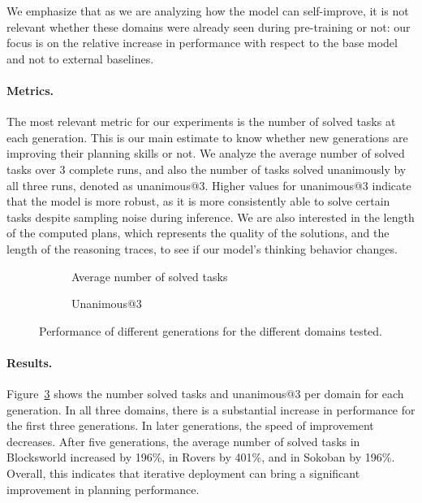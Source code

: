 We emphasize that as we are analyzing how the model can self-improve, it is not
relevant whether these domains were already seen during pre-training or not: our
focus is on the relative increase in performance with respect to the base model and not
to external baselines.

\paragraph{Metrics.}

The most relevant metric for our experiments is the number of solved tasks at
each generation. This is our main estimate to know whether new generations are
improving their planning skills or not. We analyze the average number of
solved tasks over 3 complete runs, and also the number of tasks solved
unanimously by all three runs, denoted as unanimous@3. Higher values for
unanimous@3 indicate that the model is more robust, as it is more consistently
able to solve certain tasks despite sampling noise during inference. We are also
interested in the length of the computed plans, which represents the quality of
the solutions, and the length of the reasoning traces, to see if our model's
thinking behavior changes.

\begin{figure}[t]
\centering
\begin{subfigure}{0.48\textwidth}
    \centering
    \scalebox{0.55}{}
    \caption{Average number of solved tasks}
    \label{fig:average}
\end{subfigure}
\hfill
\begin{subfigure}{0.48\textwidth}
    \centering
    \scalebox{0.55}{}
    \caption{Unanimous@3}
    \label{fig:unanimous-consent}
\end{subfigure}
\caption{Performance of different generations for the different domains tested.}
\label{fig:performance}
\end{figure}


\paragraph{Results.}

Figure~\ref{fig:performance} shows the number solved tasks and unanimous@3 per
domain for each generation. In all three domains, there is a substantial
increase in performance for the first three generations. In later generations,
the speed of improvement decreases. After five generations, the average number of solved tasks in
Blocksworld increased by 196\%, in Rovers by 401\%, and in Sokoban by
196\%. Overall, this indicates that iterative deployment can bring a significant
improvement in planning performance.

